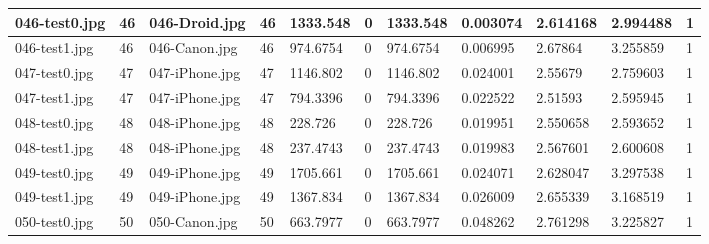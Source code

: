 \begin{landscape}
\begin{longtable}{|p{2cm}|p{1cm}|p{2cm}|p{1cm}|p{2cm}|p{1cm}|p{2cm}|p{2cm}|p{2cm}|p{2cm}|p{1cm}|}
		046-test0.jpg   & 46               & 046-Droid.jpg         & 46                          & 1333.548              & 0                       & 1333.548                   & 0.003074              & 2.614168              & 2.994488                 & 1                \\ \hline
		046-test1.jpg   & 46               & 046-Canon.jpg         & 46                          & 974.6754              & 0                       & 974.6754                   & 0.006995              & 2.67864               & 3.255859                 & 1                \\ \hline
		047-test0.jpg   & 47               & 047-iPhone.jpg        & 47                          & 1146.802              & 0                       & 1146.802                   & 0.024001              & 2.55679               & 2.759603                 & 1                \\ \hline
		047-test1.jpg   & 47               & 047-iPhone.jpg        & 47                          & 794.3396              & 0                       & 794.3396                   & 0.022522              & 2.51593               & 2.595945                 & 1                \\ \hline
		048-test0.jpg   & 48               & 048-iPhone.jpg        & 48                          & 228.726               & 0                       & 228.726                    & 0.019951              & 2.550658              & 2.593652                 & 1                \\ \hline
		048-test1.jpg   & 48               & 048-iPhone.jpg        & 48                          & 237.4743              & 0                       & 237.4743                   & 0.019983              & 2.567601              & 2.600608                 & 1                \\ \hline
		049-test0.jpg   & 49               & 049-iPhone.jpg        & 49                          & 1705.661              & 0                       & 1705.661                   & 0.024071              & 2.628047              & 3.297538                 & 1                \\ \hline
		049-test1.jpg   & 49               & 049-iPhone.jpg        & 49                          & 1367.834              & 0                       & 1367.834                   & 0.026009              & 2.655339              & 3.168519                 & 1                \\ \hline
		050-test0.jpg   & 50               & 050-Canon.jpg         & 50                          & 663.7977              & 0                       & 663.7977                   & 0.048262              & 2.761298              & 3.225827                 & 1                \\ \hline

\end{longtable}
\end{landscape}
